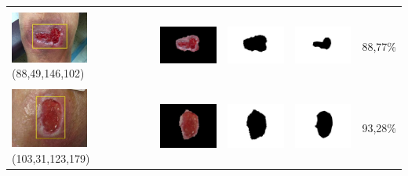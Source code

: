 \begin{table}[H]
\begin{tabular}{|m{1.0in}|m{1.0in}|m{1.0in}|m{1.0in}|m{0.6in}|}
		&  &  & \\
		\includegraphics[width=1.0in]{gambar/hasil_segmentasi/luka_merah/image_17_rect.jpg} {\centering\fontsize{10}{10}\selectfont(88,49,146,102)}&
		\includegraphics[width=1.0in]{gambar/hasil_segmentasi/luka_merah/result_17.jpg}&
		\includegraphics[width=1.0in]{gambar/hasil_segmentasi/luka_merah/mask_r_17.jpg}&
		\includegraphics[width=1.0in]{gambar/hasil_segmentasi/luka_merah/17_r.jpg}&
		88,77\% \\
		\hline

		&  &  & \\
		\includegraphics[width=1.0in]{gambar/hasil_segmentasi/luka_merah/image_22_rect.jpg} {\centering\fontsize{10}{10}\selectfont(103,31,123,179)}&
		\includegraphics[width=1.0in]{gambar/hasil_segmentasi/luka_merah/result_22.jpg}&
		\includegraphics[width=1.0in]{gambar/hasil_segmentasi/luka_merah/mask_r_22.jpg}&
		\includegraphics[width=1.0in]{gambar/hasil_segmentasi/luka_merah/22_r.jpg}&
		93,28\% \\
		\hline


\end{tabular}
\end{table}

